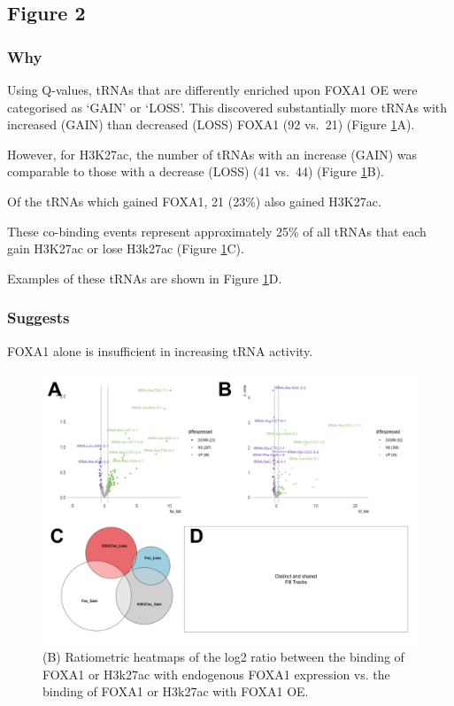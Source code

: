 \documentclass[
  12pt,
]{article}
\begin{document}
\hypertarget{figure-2}{%
\subsection{Figure 2}\label{figure-2}}

\hypertarget{why}{%
\subsubsection{Why}\label{why}}

Using Q-values, tRNAs that are differently enriched upon FOXA1 OE were categorised as `GAIN' or `LOSS'.
This discovered substantially more tRNAs with increased (GAIN) than decreased (LOSS) FOXA1 (92 vs.~21) (Figure \ref{fig:results-2}A).

However, for H3K27ac, the number of tRNAs with an increase (GAIN) was comparable to those with a decrease (LOSS) (41 vs.~44) (Figure \ref{fig:results-2}B).

Of the tRNAs which gained FOXA1, 21 (23\%) also gained H3K27ac.

These co-binding events represent approximately 25\% of all tRNAs that each gain H3K27ac or lose H3k27ac (Figure \ref{fig:results-2}C).

Examples of these tRNAs are shown in Figure \ref{fig:results-2}D.

\hypertarget{suggests}{%
\subsubsection{Suggests}\label{suggests}}

FOXA1 alone is insufficient in increasing tRNA activity.

\begin{figure}[H]

{\centering \includegraphics[width=1\linewidth]{../images/results-02} 

}

\caption{(B) Ratiometric heatmaps of the log2 ratio between the binding of FOXA1 or H3k27ac with endogenous FOXA1 expression vs. the binding of FOXA1 or H3k27ac with FOXA1 OE.}\label{fig:results-2}
\end{figure}
\end{document}
